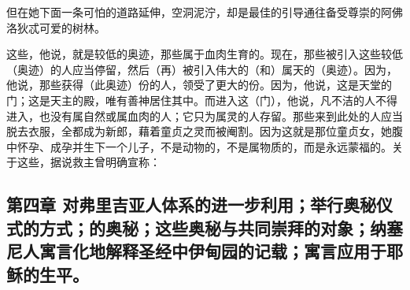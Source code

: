 但在她下面一条可怕的道路延伸，\newline{}空洞泥泞，却是最佳的引导\newline{}通往备受尊崇的阿佛洛狄忒可爱的树林。\par

这些，他说，就是较低的奥迹，那些属于血肉生育的。现在，那些被引入这些较低（奥迹）的人应当停留，然后（再）被引入伟大的（和）属天的（奥迹）。因为，他说，那些获得（此奥迹）份的人，领受了更大的份。因为，他说，这是天堂的门；这是天主的殿，唯有善神居住其中。而进入这（门），他说，凡不洁的人不得进入，也没有属自然或属血肉的人；它只为属灵的人存留。那些来到此处的人应当脱去衣服，全都成为新郎，藉着童贞之灵而被阉割。因为这就是那位童贞女，她腹中怀孕、成孕并生下一个儿子，不是动物的，不是属物质的，而是永远蒙福的。关于这些，据说救主曾明确宣称：\par


\subsection{第四章 对弗里吉亚人体系的进一步利用；举行奥秘仪式的方式；的奥秘；这些奥秘与共同崇拜的对象；纳塞尼人寓言化地解释圣经中伊甸园的记载；寓言应用于耶稣的生平。}

